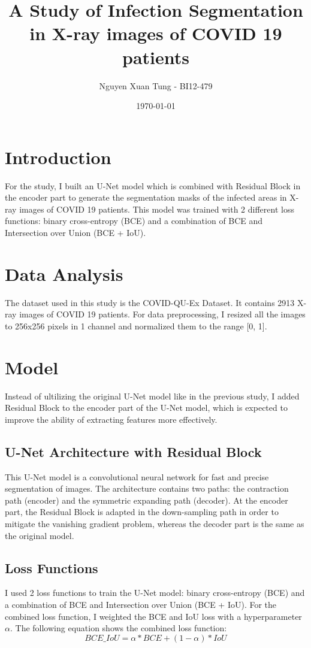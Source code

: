 \documentclass{article}
\title{A Study of Infection Segmentation in X-ray images of COVID 19 patients}
\author{Nguyen Xuan Tung - BI12-479}
\date{\today}
\begin{document}
\maketitle
\section{Introduction}
For the study, I built an U-Net model which is combined with Residual Block in the encoder part 
to generate the segmentation masks of the infected areas in X-ray images of COVID 19 patients.
This model was trained with 2 different loss functions: binary cross-entropy (BCE) and a combination
of BCE and Intersection over Union (BCE + IoU). 

\section{Data Analysis}
The dataset used in this study is the COVID-QU-Ex Dataset. It contains 2913 X-ray images of COVID 19 patients.
For data preprocessing, I resized all the images to 256x256 pixels in 1 channel and 
normalized them to the range [0, 1].

\section{Model}
Instead of ultilizing the original U-Net model like in the previous study, I added Residual Block to the encoder 
part of the U-Net model, which is expected to improve the ability of extracting features more effectively.

\subsection{U-Net Architecture with Residual Block}
This U-Net model is a convolutional neural network for fast and precise segmentation of images.
The architecture contains two paths: the contraction path (encoder) and the symmetric expanding path (decoder).
At the encoder part, the Residual Block is adapted in the down-sampling path in order to mitigate the vanishing gradient problem,
whereas the decoder part is the same as the original model.


\subsection{Loss Functions}
I used 2 loss functions to train the U-Net model: binary cross-entropy (BCE) and a combination of BCE and Intersection over Union (BCE + IoU).
For the combined loss function, I weighted the BCE and IoU loss with a hyperparameter $\alpha$. The following equation shows the combined loss function:
\begin{equation}
    BCE\_IoU = \alpha * BCE + (1 - \alpha) * IoU
\end{equation}
\end{document}
